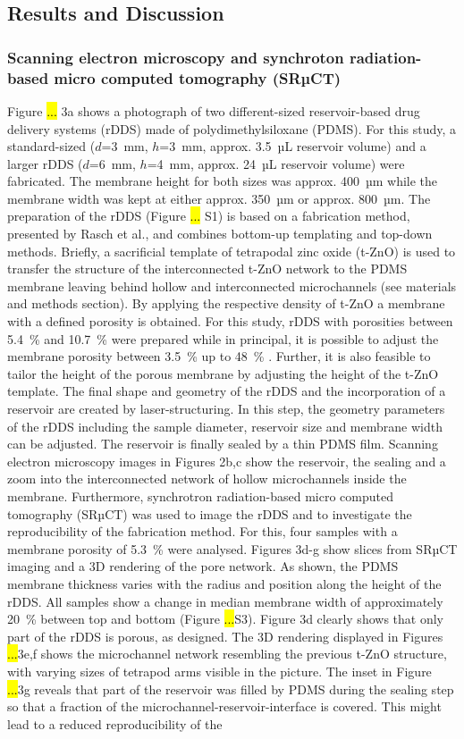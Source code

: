 \subsection{Results and Discussion}
\subsubsection{Scanning electron microscopy and synchroton radiation-based micro computed tomography (SRµCT)}
Figure \hl{...} 3a shows a photograph of two different-sized reservoir-based drug delivery systems (rDDS) made of polydimethylsiloxane (PDMS). For this study, a standard-sized ($d$=3~mm, $h$=3~mm, approx. 3.5~µL reservoir volume) and a larger rDDS ($d$=6~mm, $h$=4~mm, approx. 24~µL reservoir volume) were fabricated. The membrane height for both sizes was approx. 400~µm while the membrane width was kept at either approx. 350~µm or approx. 800~µm. The preparation of the rDDS (Figure \hl{...} S1) is based on a fabrication method, presented by Rasch et al.\supercite{rasch2020macroscopic}, and combines bottom-up templating and top-down methods. Briefly, a sacrificial template of tetrapodal zinc oxide (t-ZnO) is used to transfer the structure of the interconnected t-ZnO network to the PDMS membrane leaving behind hollow and interconnected microchannels (see materials and methods section). By applying the respective density of t-ZnO a membrane with a defined porosity is obtained. For this study, rDDS with porosities between 5.4~\% and 10.7~\% were prepared while in principal, it is possible to adjust the membrane porosity between 3.5~\% up to 48~\% \supercite{rasch2020macroscopic}. Further, it is also feasible to tailor the height of the porous membrane by adjusting the height of the t-ZnO template. The final shape and geometry of the rDDS and the incorporation of a reservoir are created by laser-structuring. In this step, the geometry parameters of the rDDS including the sample diameter, reservoir size and membrane width can be adjusted. The reservoir is finally sealed by a thin PDMS film. Scanning electron microscopy images in Figures 2b,c show the reservoir, the sealing and a zoom into the interconnected network of hollow microchannels inside the membrane. Furthermore, synchrotron radiation-based micro computed tomography (SRµCT) was used to image the rDDS and to investigate the reproducibility of the fabrication method. For this, four samples with a membrane porosity of 5.3~\% were analysed. Figures 3d-g show slices from SRµCT imaging and a 3D rendering of the pore network. As shown, the PDMS membrane thickness varies with the radius and position along the height of the rDDS. All samples show a change in median membrane width of approximately 20~\% between top and bottom (Figure \hl{...}S3). Figure 3d clearly shows that only part of the rDDS is porous, as designed. The 3D rendering displayed in Figures \hl{...}3e,f shows the microchannel network resembling the previous t-ZnO structure, with varying sizes of tetrapod arms visible in the picture. The inset in Figure \hl{...}3g reveals that part of the reservoir was filled by PDMS during the sealing step so that a fraction of the microchannel-reservoir-interface is covered. This might lead to a reduced reproducibility of the 